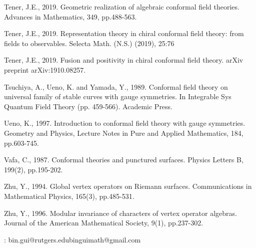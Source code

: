 \documentclass[12pt,a4paper,notitlepage]{article}
\theoremstyle{definition}
\theoremstyle{plain}
\numberwithin{equation}{section}
\begin{document}
\begin{thebibliography}{999999}
Tener, J.E., 2019. Geometric realization of algebraic conformal field theories. Advances in Mathematics, 349, pp.488-563.


Tener, J.E., 2019. Representation theory in chiral conformal field theory: from fields to
observables. Selecta Math. (N.S.) (2019), 25:76

Tener, J.E., 2019. Fusion and positivity in chiral conformal field theory. arXiv preprint arXiv:1910.08257.
		

Tsuchiya, A., Ueno, K. and Yamada, Y., 1989. Conformal field theory on universal family of stable curves with gauge symmetries. In Integrable Sys Quantum Field Theory (pp. 459-566). Academic Press.
	
Ueno, K., 1997. Introduction to conformal field theory with gauge symmetries. Geometry and Physics, Lecture Notes in Pure and Applied Mathematics, 184, pp.603-745.

		

Vafa, C., 1987. Conformal theories and punctured surfaces. Physics Letters B, 199(2), pp.195-202.	
		
Zhu, Y., 1994. Global vertex operators on Riemann surfaces. Communications in Mathematical Physics, 165(3), pp.485-531.
		
Zhu, Y., 1996. Modular invariance of characters of vertex operator algebras. Journal of the American Mathematical Society, 9(1), pp.237-302.
		
		
		
		
		
	\end{thebibliography}
	
	: bin.gui@rutgers.edu\qquad binguimath@gmail.com
\end{document}
